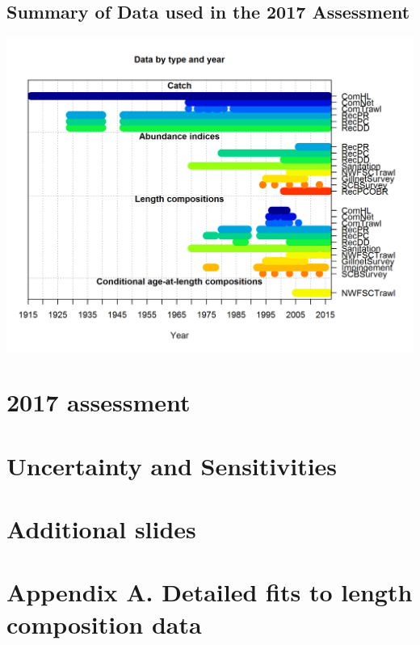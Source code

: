 \documentclass[ignorenonframetext,compress]{beamer}
\begin{document}
\subsection{Summary of Data used in the 2017
Assessment}\label{summary-of-data-used-in-the-2017-assessment}

\includegraphics{r4ss/plots_mod1/data_plot.png}

\section{2017 assessment}\label{assessment}

\section{Uncertainty and
Sensitivities}\label{uncertainty-and-sensitivities}

\section{Additional slides}\label{additional-slides}

\FloatBarrier
\newpage

\section*{Appendix A. Detailed fits to length composition
data}\label{appendix-a.-detailed-fits-to-length-composition-data}
\end{document}
